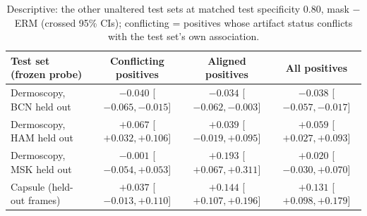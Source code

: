 \begin{table}[H]\centering\scriptsize
\caption{Descriptive: the other unaltered test sets at matched test specificity 0.80, mask $-$ ERM (crossed 95\% CIs); conflicting = positives whose artifact status conflicts with the test set's own association.}\label{tab:s16matchedother}
\begin{tabular}{lccc}\toprule
Test set (frozen probe) & Conflicting positives & Aligned positives & All positives \\\midrule
Dermoscopy, BCN held out & $-0.040$ [$-0.065, -0.015$] & $-0.034$ [$-0.062, -0.003$] & $-0.038$ [$-0.057, -0.017$] \\
Dermoscopy, HAM held out & $+0.067$ [$+0.032, +0.106$] & $+0.039$ [$-0.019, +0.095$] & $+0.059$ [$+0.027, +0.093$] \\
Dermoscopy, MSK held out & $-0.001$ [$-0.054, +0.053$] & $+0.193$ [$+0.067, +0.311$] & $+0.020$ [$-0.030, +0.070$] \\
Capsule (held-out frames) & $+0.037$ [$-0.013, +0.110$] & $+0.144$ [$+0.107, +0.196$] & $+0.131$ [$+0.098, +0.179$] \\
\bottomrule\end{tabular}
\end{table}
